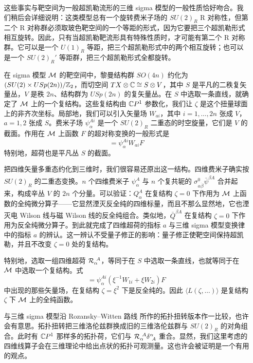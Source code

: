 这些事实与靶空间为一般超凯勒流形的三维 sigma 模型的一般性质恰好吻合。我们稍后会详细说明：这类模型总有一个旋转费米子场的 $SU(2)_R$ R 对称性，但第二个 R 对称群必须取玻色靶空间的一个等距的形式，因为它要把三个超凯勒形式相互旋转。因此，只有当超凯勒靶流形具有特殊性质时，才可能有第二个 R 对称群。它可以是一个 $U(1)_R$ 等距，把三个超凯勒形式中的两个相互旋转；也可以是一个 $SU(2)_{R}'$ 等距群，把三个超凯勒形式全都旋转。

在 sigma 模型 $\mathcal{M}$ 的靶空间中，黎曼结构群 $SO(4n)$ 约化为 $(SU(2)\times USp(2n))/\mathbb{Z}_2 $，而切空间 $TX\otimes\mathbb{C} \cong S \otimes V$，其中 $S$ 是平凡的二秩复矢量丛，$V$ 是秩 $2n$、结构群为 $USp(2n)$ 的复矢量丛。在 $S$ 中选取一条直线，就确定了 $\mathcal{M}$ 上的一个复结构。这些复结构由 $\mathbb{C} P^1$ 参数化，我们让 $\zeta $ 是这个扭量球面上的非齐次坐标。局部地，我们可以引入矢量场 $W_{a i}$，其中 $i=1,\dots, 2n$ 张成 $V$，$a=1,2$ 张成 $S$。费米子场 $\psi_{\alpha}^{A i}$ 是一个 $SU(2)_R$ 二重态的时空旋量，它们是 $V$ 的截面。作用在 $\mathcal{M}$ 上函数 $F$ 的超对称变换的一般形式是
%
\begin{equation}
[Q^{~A}_{a~\alpha} , F] = \psi_{\alpha}^{A i} W_{a i} F
\end{equation}
%
特别地，超荷也是平凡丛 $S$ 的截面。

把四维矢量多重态约化到三维时，我们很容易还原出这一结构。四维费米子确实按 $SU(2)_R$ 的二重态变换。$n$ 个四维费米子 $\psi_\alpha^{A}$ 与 $n$ 个复共轭的 $\sigma^0_{\alpha\dot\beta} \bar \psi^{\dot \beta A}$ 合并起来，构成辛丛 $V$ 的 $2n$ 个分量。可以验证：$Q_\alpha^A$ 在复结构 $\zeta=0$ 下作用为 $\mathcal{M}$ 上函数的全纯微分算子——它显然湮灭反全纯的四维标量，而且不那么显然地，它也湮灭电 Wilson 线与磁 Wilson 线的反全纯组合。类似地，$\bar Q^{\dot \beta A}$ 在复结构 $\zeta=0$ 下作用为反全纯微分算子。到此就完成了四维超荷的指标 $a$ 与三维 sigma 模型变换律中的指标 $a$ 的辨认。这一辨认不受量子修正的影响：量子修正使靶空间保持超凯勒，并且不改变 $\zeta=0$ 处的复结构。

特别地，选取一组四维超荷 $\mathcal{R}_{\alpha}^{~A}$，等同于在 $S$ 中选取一条直线，也就等同于在 $\mathcal{M}$ 中选取一个复结构。式
%
\begin{equation}
[\CR_{\alpha}^{~A} , F] = \psi_{\alpha}^{A i} \left( \xi^{-1} W_{1 i}+ \xi W_{2 i} \right) F
\end{equation}
%
中出现的那些矢量场，在复结构 $\zeta = \xi^2$ 下是反全纯的。因此 $\langle L(\zeta,\dots ) \rangle$ 是复结构 $\zeta$ 下 $\mathcal{M}$ 上的全纯函数。

与三维 sigma 模型沿 Rozansky--Witten 路线 \cite{Rozansky:1996bq} 所作的拓扑扭转版本作一比较，也许会有意思。拓扑扭转把三维洛伦兹群换成旧的三维洛伦兹群与 $SU(2)_R$ 的对角组合。此时有 $\mathbb{C} P^1$ 那样多的拓扑荷，它们与 $\mathcal{R}_{\alpha}^{~A} \delta^{\alpha}_{~A}$ 重合。显然，我们这里考虑的四维线算子会在三维理论中给出点状的拓扑可观测量。这也许会被证明是一个有用的观点。

